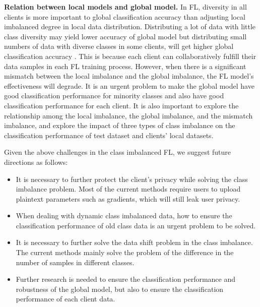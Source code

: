 \documentclass[10pt,journal,compsoc]{IEEEtran}
\begin{document}
	\textbf{Relation between local models and global model.}	
	In FL, diversity in all clients is more important to global classification accuracy than adjusting local imbalanced degree in local data distribution. Distributing a lot of data with little class diversity may yield lower accuracy of global model but distributing small numbers of data with diverse classes in some clients, will get higher global classification accuracy \cite{sittijuk2021performance}. This is because each client can collaboratively fulfill their data samples in each FL training process. However, when there is a significant mismatch between the local imbalance and the global imbalance, the FL model's effectiveness will degrade. It is an urgent problem to make the global model have good classification performance for minority classes and also have good classification performance for each client. It is also important to explore the relationship among the local imbalance, the global imbalance, and the mismatch imbalance, and explore the impact of three types of class imbalance on the classification performance of test dataset and clients' local datasets.
	
	Given the above challenges in the class imbalanced FL, we suggest future directions as follows:
	\begin{itemize}
		\item It is necessary to further protect the client's privacy while solving the class imbalance problem. Most of the current methods require users to upload plaintext parameters such as gradients, which will still leak user privacy.
		
		\item When dealing with dynamic class imbalanced data, how to ensure the classification performance of old class data is an urgent problem to be solved.
		
		\item It is necessary to further solve the data shift problem in the class imbalance. The current methods mainly solve the problem of the difference in the number of samples in different classes.
		
		\item Further research is needed to ensure the classification performance and robustness of the global model, but also to ensure the classification performance of each client data.
	\end{itemize}
	
\end{document}
